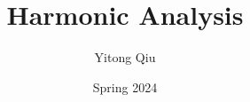 \usepackage{titling}
\renewcommand*{\maketitle}{
    \begin{titlepage}
    \newgeometry{margin = 0in}
    \parindent=0pt
    \texttt{[image: cover1.jpg]}  
    \vfill
    \begin{center}
        \parbox{0.618\textwidth}{
        \hfill {\bfseries \Huge \thetitle} \\[0.6pt]  
        \rule{0.618\textwidth}{4pt} \\ 
    }
    \end{center}
    \vfill
    \begin{center}
        \parbox{0.618\textwidth}{
        \hfill\Large
        \kaishu 
          \begin{tabular}{r|}
          Author：\theauthor \\ 
          Time：\thedate \\
        \end{tabular}
        }
    \end{center}
    \vfill
    \begin{center}
        \parbox[t]{0.7\textwidth}{\centering \kaishu }
    \end{center}
    \vfill
\end{titlepage}
\restoregeometry
\thispagestyle{empty}
}

\title{Harmonic Analysis}
\author{Yitong Qiu}
\date{Spring 2024}